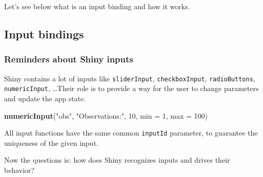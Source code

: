 \documentclass[]{book}
\newenvironment{Shaded}{\begin{snugshade}}{\end{snugshade}}
\newcommand{\ControlFlowTok}[1]{\textcolor[rgb]{0.13,0.29,0.53}{\textbf{#1}}}
\newcommand{\DataTypeTok}[1]{\textcolor[rgb]{0.13,0.29,0.53}{#1}}
\newcommand{\DecValTok}[1]{\textcolor[rgb]{0.00,0.00,0.81}{#1}}
\newcommand{\KeywordTok}[1]{\textcolor[rgb]{0.13,0.29,0.53}{\textbf{#1}}}
\newcommand{\NormalTok}[1]{#1}
\newcommand{\OperatorTok}[1]{\textcolor[rgb]{0.81,0.36,0.00}{\textbf{#1}}}
\newcommand{\StringTok}[1]{\textcolor[rgb]{0.31,0.60,0.02}{#1}}
\begin{document}
Let's see below what is an input binding and how it works.

\hypertarget{input-bindings}{%
\subsection{Input bindings}\label{input-bindings}}

\hypertarget{reminders-about-shiny-inputs}{%
\subsubsection{Reminders about Shiny inputs}\label{reminders-about-shiny-inputs}}

Shiny contains a lot of inputs like \texttt{sliderInput}, \texttt{checkboxInput}, \texttt{radioButtons}, \texttt{numericInput}, \ldots{}Their role is to provide a way for the user to change parameters and update the app state.

\begin{Shaded}
\begin{Highlighting}[]
\KeywordTok{numericInput}\NormalTok{(}\StringTok{"obs"}\NormalTok{, }\StringTok{"Observations:"}\NormalTok{, }\DecValTok{10}\NormalTok{, }\DataTypeTok{min =} \DecValTok{1}\NormalTok{, }\DataTypeTok{max =} \DecValTok{100}\NormalTok{)}
\end{Highlighting}
\end{Shaded}

All input functions have the same common \texttt{inputId} parameter, to guarantee the uniqueness of the given input.

\begin{Shaded}
\end{Shaded}

Now the questions is: how does Shiny recognizes inputs and drives their behavior?
\end{document}
